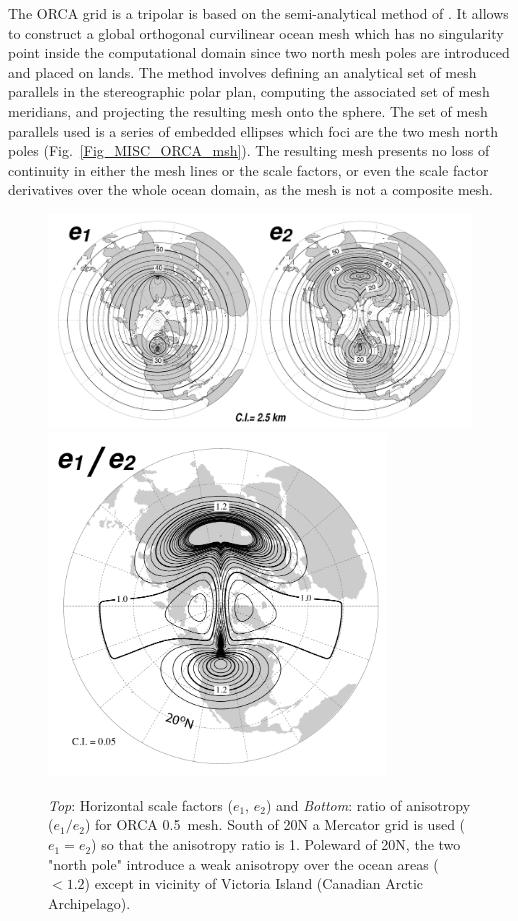 The ORCA grid is a tripolar is based on the semi-analytical method of \citet{Madec_Imbard_CD96}. 
It allows to construct a global orthogonal curvilinear ocean mesh which has no singularity point inside 
the computational domain since two north mesh poles are introduced and placed on lands.
The method involves defining an analytical set of mesh parallels in the stereographic polar plan, 
computing the associated set of mesh meridians, and projecting the resulting mesh onto the sphere. 
The set of mesh parallels used is a series of embedded ellipses which foci are the two mesh north 
poles (Fig.~\ref{Fig_MISC_ORCA_msh}). The resulting mesh presents no loss of continuity in 
either the mesh lines or the scale factors, or even the scale factor derivatives over the whole 
ocean domain, as the mesh is not a composite mesh. 
\begin{figure}[!tbp]  \begin{center}
\includegraphics[width=1.0\textwidth]{./TexFiles/Figures/Fig_ORCA_NH_msh05_e1_e2.pdf}
\includegraphics[width=0.80\textwidth]{./TexFiles/Figures/Fig_ORCA_aniso.pdf}
\caption {  \label{Fig_MISC_ORCA_e1e2}
\textit{Top}: Horizontal scale factors ($e_1$, $e_2$) and 
\textit{Bottom}: ratio of anisotropy ($e_1 / e_2$)
for ORCA 0.5\deg ~mesh. South of 20\deg N a Mercator grid is used ($e_1 = e_2$) 
so that the anisotropy ratio is 1. Poleward of 20\deg N, the two "north pole" 
introduce a weak anisotropy over the ocean areas ($< 1.2$) except in vicinity of Victoria Island 
(Canadian Arctic Archipelago). }
\end{center}   \end{figure}
